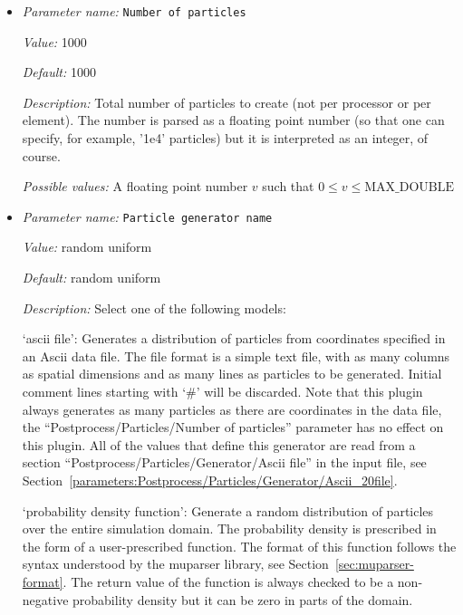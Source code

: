 \begin{itemize}
{\it Possible values:} An integer $n$ such that $0\leq n \leq 2147483647$
\item {\it Parameter name:} {\tt Number of particles}
\label{parameters:Postprocess/Particles/Number of particles}


{\it Value:} 1000


{\it Default:} 1000


{\it Description:} Total number of particles to create (not per processor or per element). The number is parsed as a floating point number (so that one can specify, for example, '1e4' particles) but it is interpreted as an integer, of course.


{\it Possible values:} A floating point number $v$ such that $0 \leq v \leq \text{MAX\_DOUBLE}$
\item {\it Parameter name:} {\tt Particle generator name}
\label{parameters:Postprocess/Particles/Particle generator name}


{\it Value:} random uniform


{\it Default:} random uniform


{\it Description:} Select one of the following models:

`ascii file': Generates a distribution of particles from coordinates specified in an Ascii data file. The file format is a simple text file, with as many columns as spatial dimensions and as many lines as particles to be generated. Initial comment lines starting with `\#' will be discarded. Note that this plugin always generates as many particles as there are coordinates in the data file, the ``Postprocess/Particles/Number of particles'' parameter has no effect on this plugin. All of the values that define this generator are read from a section ``Postprocess/Particles/Generator/Ascii file'' in the input file, see Section~\ref{parameters:Postprocess/Particles/Generator/Ascii_20file}.

`probability density function': Generate a random distribution of particles over the entire simulation domain. The probability density is prescribed in the form of a user-prescribed function. The format of this function follows the syntax understood by the muparser library, see Section~\ref{sec:muparser-format}. The return value of the function is always checked to be a non-negative probability density but it can be zero in parts of the domain.


\end{itemize}
